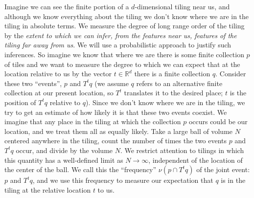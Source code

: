 \documentclass[reqno]{stml-l}
\theoremstyle{plain}
\theoremstyle{definition}
\numberwithin{equation}{chapter}
\begin{document}
Imagine we can see the finite portion of a $d$-dimensional
tiling near us, and although we know everything about the
tiling we don't know where we are in the tiling in absolute
terms. We measure the degree of long range order of the
tiling by the \emph{extent to which we can infer, from the
features near us, features of the tiling far away from us}.
We will use a probabilistic approach to justify such
inferences. So imagine we know that where we are there is
some finite collection $p$ of tiles and we want to measure
the degree to which we can expect that at the location
relative to us by the vector $t\in \mathbb{R}^{d}$ there is
a finite collection $q$. Consider these two ``events'', $p$
and $T^{t}q$ (we assume $q$ refers to an alternative finite
collection at our present location, so
$T^{t}$ translates it to the
desired place; $t$ is the position of $T^{t}q$ relative to
$q$). Since we don't know where we are in the tiling, we
try to get an estimate of how likely it is that these two
events coexist. We imagine that any place in the tiling at
which the collection $p$ occurs could be our location, and
we treat them all as equally likely. Take a large ball of
volume $N$ centered anywhere in the tiling, count the
number of times the two events $p$ and $T^{t}q$ occur, and
divide by the volume $N$. We restrict attention to tilings
in which this quantity has a well-defined limit as
$N\rightarrow\infty$, independent of the location of the
center of the ball. We call this the ``frequency''
$\nu(p\cap T^{t}q)$ of the joint event: $p$ and $T^{t}q$,
and we use this frequency to measure our expectation that
$q$ is in the tiling at the relative location $t$ to us.
\end{document}
